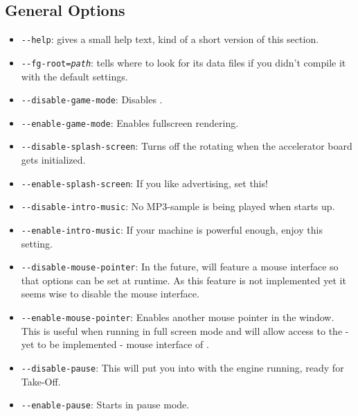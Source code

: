 \subsection{General Options}

\begin{itemize}

\item{\texttt{-$\!$-help}}: gives a small help text, kind of a short version of this section.

\item{\texttt{-$\!$-fg-root={\it path}}}: tells \FlightGear where to look for its data
  files if you didn't compile it with the default settings.

\item{\texttt{-$\!$-disable-game-mode}}: Disables .


\item{\texttt{-$\!$-enable-game-mode}}: Enables fullscreen rendering.


\item{\texttt{-$\!$-disable-splash-screen}}: Turns off the rotating  when the accelerator board gets initialized.

\item{\texttt{-$\!$-enable-splash-screen}}: If you like advertising, set this!

\item{\texttt{-$\!$-disable-intro-music}}: No MP3-sample is being played when
  \FlightGear starts up.

\item{\texttt{-$\!$-enable-intro-music}}: If your machine is powerful enough, enjoy
  this setting.

\item{\texttt{-$\!$-disable-mouse-pointer}}: In the future, \FlightGear will
  feature a mouse interface so that options can be set at runtime.  As
  this feature is not implemented yet it seems wise to disable the
  mouse interface.

\item{\texttt{-$\!$-enable-mouse-pointer}}: Enables another mouse pointer in the
  \FlightGear window. This is useful when running \FlightGear in full
  screen mode and will allow access to the - yet to be implemented -
  mouse interface of \FlightGear\hspace{-2mm}.

\item{\texttt{-$\!$-disable-pause}}: This will put you into \FlightGear with the
  engine running, ready for Take-Off.

\item{\texttt{-$\!$-enable-pause}}: Starts \FlightGear in pause mode.

\end{itemize}

